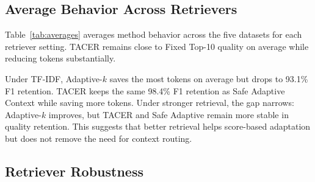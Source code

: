 \documentclass[11pt]{article}
\begin{document}
\subsection{Average Behavior Across Retrievers}

Table~\ref{tab:averages} averages method behavior across the five datasets for each retriever setting. TACER remains close to Fixed Top-10 quality on average while reducing tokens substantially.

\begin{table}[t]
\centering
\small
\caption{Average quality retention and token reduction across five datasets. Retention is measured relative to Fixed Top-10 under the same retriever.}
\label{tab:averages}
\end{table}

Under TF-IDF, Adaptive-$k$ saves the most tokens on average but drops to 93.1\% F1 retention. TACER keeps the same 98.4\% F1 retention as Safe Adaptive Context while saving more tokens. Under stronger retrieval, the gap narrows: Adaptive-$k$ improves, but TACER and Safe Adaptive remain more stable in quality retention. This suggests that better retrieval helps score-based adaptation but does not remove the need for context routing.

\subsection{Retriever Robustness}
\end{document}
